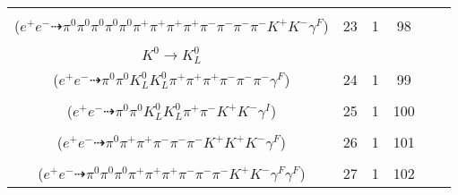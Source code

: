 \documentclass[landscape]{article}
\newcounter{rownumbers}
\newcommand\rn{\stepcounter{rownumbers}\arabic{rownumbers}}
\newcommand{\EOL}{\\} %
\newcommand{\topoTags}[1]{#1} %
\begin{document}
\begin{longtable}{clcccc}
\rn & \makecell[l]{ $ 
e^{+} e^{-} \rightarrow \pi^{0} \pi^{0} \pi^{0} \pi^{+} \pi^{-} \pi^{-} \omega \omega \bar{K}^{*} K^{+} ,
\omega \rightarrow \pi^{0} \pi^{+} \pi^{-} ,
\omega \rightarrow \pi^{0} \pi^{+} \pi^{-} ,
\bar{K}^{*} \rightarrow \pi^{+} K^{-} \gamma^{F} 
$ \\ ($
e^{+} e^{-} \dashrightarrow \pi^{0} \pi^{0} \pi^{0} \pi^{0} \pi^{0} \pi^{+} \pi^{+} \pi^{+} \pi^{+} \pi^{-} \pi^{-} \pi^{-} \pi^{-} K^{+} K^{-} \gamma^{F} 
$) } & \topoTags{23 & }1 & 98 \EOL

\rn & \makecell[l]{ $ 
e^{+} e^{-} \rightarrow \rho^{0} \pi^{-} \rho^{+} \rho^{-} \bar{K}^{0} K^{*+} ,
\rho^{0} \rightarrow \pi^{+} \pi^{-} \gamma^{F} ,
\rho^{+} \rightarrow \pi^{0} \pi^{+} ,
\rho^{-} \rightarrow \pi^{0} \pi^{-} ,
\bar{K}^{0} \rightarrow K_{L}^{0} ,
K^{*+} \rightarrow \pi^{+} K^{0} ,
$ \\ $
K^{0} \rightarrow K_{L}^{0} 
$ \\ ($
e^{+} e^{-} \dashrightarrow \pi^{0} \pi^{0} K_{L}^{0} K_{L}^{0} \pi^{+} \pi^{+} \pi^{+} \pi^{-} \pi^{-} \pi^{-} \gamma^{F} 
$) } & \topoTags{24 & }1 & 99 \EOL

\rn & \makecell[l]{ $ 
e^{+} e^{-} \rightarrow \pi^{0} \omega K^{0} \bar{K}^{0} K^{+} K^{-} \gamma^{I} ,
\omega \rightarrow \pi^{0} \pi^{+} \pi^{-} ,
K^{0} \rightarrow K_{L}^{0} ,
\bar{K}^{0} \rightarrow K_{L}^{0} 
$ \\ ($
e^{+} e^{-} \dashrightarrow \pi^{0} \pi^{0} K_{L}^{0} K_{L}^{0} \pi^{+} \pi^{-} K^{+} K^{-} \gamma^{I} 
$) } & \topoTags{25 & }1 & 100 \EOL

\rn & \makecell[l]{ $ 
e^{+} e^{-} \rightarrow \pi^{+} \rho^{-} \bar{K}^{0} K^{*} \phi ,
\rho^{-} \rightarrow \pi^{0} \pi^{-} \gamma^{F} ,
\bar{K}^{0} \rightarrow K_{S}^{0} ,
K^{*} \rightarrow \pi^{-} K^{+} ,
\phi \rightarrow K^{+} K^{-} ,
K_{S}^{0} \rightarrow \pi^{+} \pi^{-} 
$ \\ ($
e^{+} e^{-} \dashrightarrow \pi^{0} \pi^{+} \pi^{+} \pi^{-} \pi^{-} \pi^{-} K^{+} K^{+} K^{-} \gamma^{F} 
$) } & \topoTags{26 & }1 & 101 \EOL

\rn & \makecell[l]{ $ 
e^{+} e^{-} \rightarrow \pi^{0} \rho^{0} \pi^{+} \pi^{+} \pi^{-} \rho^{-} K^{+} K^{*-} ,
\rho^{0} \rightarrow \pi^{+} \pi^{-} ,
\rho^{-} \rightarrow \pi^{0} \pi^{-} \gamma^{F} \gamma^{F} ,
K^{*-} \rightarrow \pi^{0} K^{-} 
$ \\ ($
e^{+} e^{-} \dashrightarrow \pi^{0} \pi^{0} \pi^{0} \pi^{+} \pi^{+} \pi^{+} \pi^{-} \pi^{-} \pi^{-} K^{+} K^{-} \gamma^{F} \gamma^{F} 
$) } & \topoTags{27 & }1 & 102 \EOL


\end{longtable}
\end{document}
